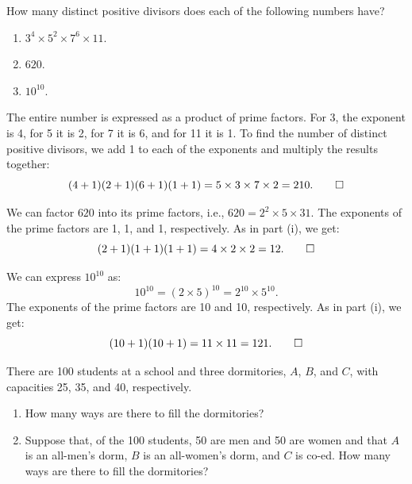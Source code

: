 
\begin{problem}[4]
  How many distinct positive divisors does each of the following numbers have?
  \begin{enumerate}
    \item $3^4 \times 5^2 \times 7^6 \times 11$.
    \item $620$.
    \item $10^{10}$.
  \end{enumerate}
\end{problem}

\begin{solution}[(i)]
  The entire number is expressed as a product of prime factors. For 3, the exponent is 4, for 5 it is 2, for 7 it is 6, and for 11 it is 1. To find the number of distinct positive divisors, we add 1 to each of the exponents and multiply the results together:
  \[%
    (4 + 1)(2 + 1)(6 + 1)(1 + 1) = 5 \times 3 \times 7 \times 2 = 210
  .\qedhere\]%
\end{solution}

\begin{solution}[(ii)]
  We can factor $620$ into its prime factors, i.e., $620 = 2^2 \times 5 \times 31$. The exponents of the prime factors are 1, 1, and 1, respectively. As in part (i), we get:
  \[%
    (2 + 1)(1 + 1)(1 + 1) = 4 \times 2 \times 2 = 12
  .\qedhere\]%
\end{solution}

\begin{solution}[(iii)]
  We can express $10^{10}$ as:
  \[%
    10^{10} = (2 \times 5)^{10} = 2^{10} \times 5^{10}
  .\]%
  The exponents of the prime factors are 10 and 10, respectively. As in part (i), we get:
  \[%
    (10 + 1)(10 + 1) = 11 \times 11 = 121
  .\qedhere\]%
\end{solution}

\begin{problem}[13]
  There are 100 students at a school and three dormitories, $A$, $B$, and $C$, with capacities 25, 35, and 40, respectively.
  \begin{enumerate}
    \item How many ways are there to fill the dormitories?
    \item Suppose that, of the 100 students, 50 are men and 50 are women and that $A$ is an all-men's dorm, $B$ is an all-women's dorm, and $C$ is co-ed. How many ways are there to fill the dormitories?
  \end{enumerate}
\end{problem}

